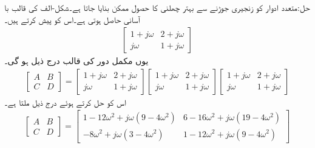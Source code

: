 حل:متعدد  ادوار کو زنجیری جوڑنے سے بہتر چھلنی کا حصول ممکن بنایا جاتا ہے۔شکل-الف کی قالب با آسانی حاصل ہوتی ہے۔اس کو پیش کرتے ہیں۔
\begin{align*}
\begin{bmatrix}
1+j\omega& 2+j\omega\\
j\omega&1+j\omega
\end{bmatrix}
\end{align*}
یوں مکمل دور کی قالب درج ذیل ہو گی۔
\begin{align*}
\begin{bmatrix}
A& B\\
C&D
\end{bmatrix}
=
\begin{bmatrix}
1+j\omega& 2+j\omega\\
j\omega&1+j\omega
\end{bmatrix}
\begin{bmatrix}
1+j\omega& 2+j\omega\\
j\omega&1+j\omega
\end{bmatrix}
\begin{bmatrix}
1+j\omega& 2+j\omega\\
j\omega&1+j\omega
\end{bmatrix}
\end{align*}
اس کو حل کرتے ہوئے درج ذیل ملتا ہے۔
\begin{align*}
\begin{bmatrix}
A& B\\
C&D
\end{bmatrix}
=
\begin{bmatrix}
1-12\omega^2+j\omega(9-4\omega^2) & 6-16\omega^2+j\omega(19-4\omega^2)\\
-8\omega^2+j\omega(3-4\omega^2)&1-12\omega^2+j\omega(9-4\omega^2)
\end{bmatrix}
\end{align*}


